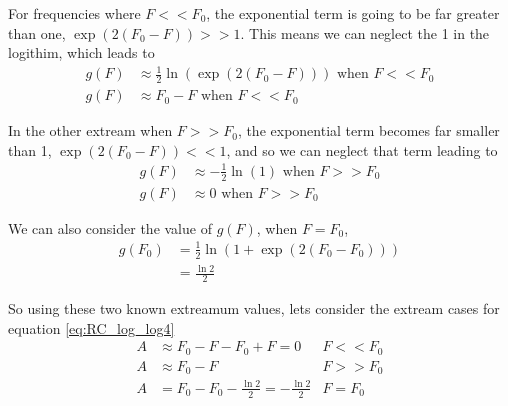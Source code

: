 For frequencies where $F << F_0$, the exponential term is going to be far greater
than one, $\exp \left( 2 (F_0 - F) \right) >> 1$. This means we can neglect the
1 in the logithim, which leads to
\begin{align}
  g(F) &\approx \frac{1}{2}\ln\left(\exp \left( 2 (F_0 - F) \right)\right) \text{ when } F<<F_0 \nonumber \\
  g(F) &\approx F_0 - F  \text{ when } F<<F_0
\end{align}

In the other extream when $F>>F_0$, the exponential term becomes far smaller than 1,
$\exp \left( 2 (F_0 - F) \right) << 1$, and so we can neglect that term leading to
\begin{align}
  g(F) &\approx -\frac{1}{2}\ln\left(1\right) \text{ when } F>>F_0 \nonumber \\
  g(F) &\approx 0  \text{ when } F>>F_0
\end{align}

We can also consider the value of $g(F)$, when $F=F_0$,
\begin{align}
  g(F_0) &= \frac{1}{2}\ln\left(1+\exp \left( 2 (F_0 - F_0) \right)\right) \nonumber \\
  &= \frac{\ln 2}{2}
\end{align}

So using these two known extreamum values, lets consider the extream cases for
equation \ref{eq:RC_log_log4}
\begin{align}
  A &\approx F_0 -F - F_0 + F = 0 & F<<F_0 \nonumber \\
  A &\approx F_0 -F &F>>F_0 \nonumber \\
  A &= F_0 -F_0 - \frac{\ln 2}{2} = - \frac{\ln 2}{2}&F=F_0
\end{align}

